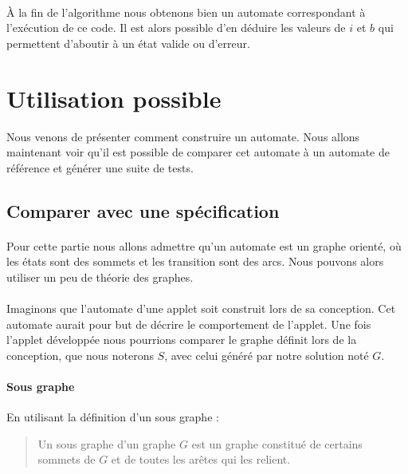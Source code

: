 \paragraph{}
À la fin de l'algorithme nous obtenons bien un automate correspondant à 
l'exécution de ce code. Il est alors possible d'en déduire les valeurs de $i$ 
et 
$b$ qui permettent d'aboutir à un état valide ou d'erreur.

\section{Utilisation possible}

Nous venons de présenter comment construire un automate. Nous allons maintenant 
voir qu'il est possible de comparer cet automate à un automate de référence et 
générer une suite de tests.

\subsection{Comparer avec une spécification}

\paragraph{}
Pour cette partie nous allons admettre qu'un automate est un graphe orienté, où 
les états sont des sommets et les transition sont des arcs. Nous pouvons alors 
utiliser un peu de théorie des graphes.

\paragraph{}
Imaginons que l'automate d'une applet soit construit lors de sa conception. Cet 
automate aurait pour but de décrire le comportement de l'applet. Une fois l'applet 
développée nous pourrions comparer le graphe définit lors 
de la conception, que nous noterons $S$, avec celui généré par notre solution 
 noté $G$.

\paragraph{Sous graphe}
En utilisant la définition d'un sous graphe \cite{th_graph}:

\begin{quote}
 Un sous graphe d’un graphe $G$ est un graphe constitué de certains sommets de 
$G$ et de toutes les arêtes qui les relient.
\end{quote}


